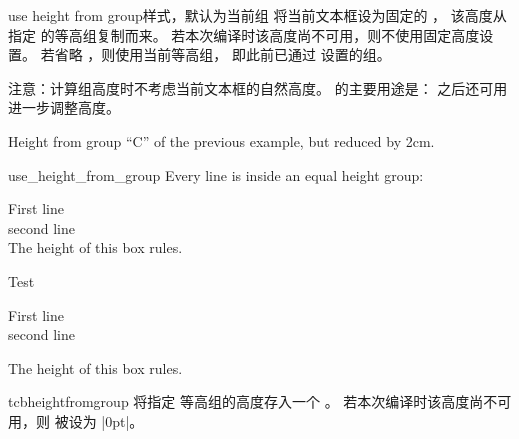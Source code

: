 \clearpage
\begin{docTcbKey}[][doc new and updated={2015-11-27}{2016-02-22}]{use height from group}{}{样式，默认为当前组}
  将当前文本框设为固定的 ，
  该高度从指定  的等高组复制而来。
  若本次编译时该高度尚不可用，则不使用固定高度设置。
  若省略 ，则使用当前等高组，
  即此前已通过  设置的组。\par
  注意：计算组高度时不考虑当前文本框的自然高度。
   的主要用途是：
  之后还可用  进一步调整高度。

\begin{dispExample}
\begin{tcolorbox}[use height from group=C,add to height=-2cm,
  colframe=blue!75!black,colback=white]
Height from group \enquote{C} of the previous example, but reduced by 2cm.
\end{tcolorbox}%
\end{dispExample}

\begin{exdispExample}[runs=2]{use_height_from_group}
Every line is inside an equal height group:
\begin{tcbraster}[raster equal height=rows,
    title=Box \thetcbrasternum,
    enhanced,size=small,colframe=red!50!black,colback=red!10!white]
  \begin{tcolorbox}First line\\second line\\
    The height of this box rules.\end{tcolorbox}
  \begin{tcolorbox}Test\end{tcolorbox}
  \begin{tcolorbox}
    First line\\second line\end{tcolorbox}
  \begin{tcolorbox}The height of this box rules.\end{tcolorbox}
\end{tcbraster}
\end{exdispExample}
\end{docTcbKey}



\begin{docCommand}[doc new=2015-11-27]{tcbheightfromgroup}{}
  将指定  等高组的高度存入一个 。
  若本次编译时该高度尚不可用，则  被设为 |0pt|。
\end{docCommand}


